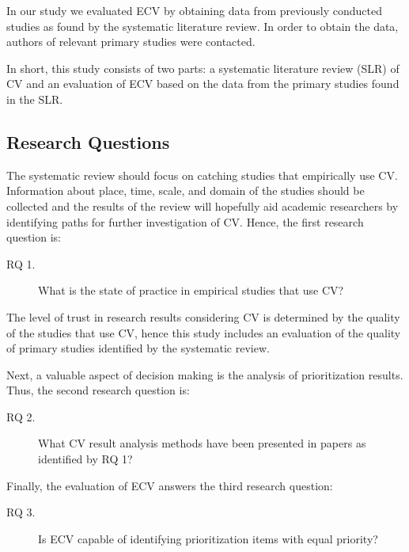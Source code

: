 In our study we evaluated ECV by obtaining data from previously conducted studies as found by the systematic literature review. In order to obtain the data, authors of relevant primary studies were contacted.

In short, this study consists of two parts: a systematic literature review (SLR) of CV and an evaluation of ECV based on the data from the primary studies found in the SLR.

\subsection{Research Questions}

The systematic review should focus on catching studies that empirically use CV. Information about place, time, scale, and domain of the studies should be collected and the results of the review will hopefully aid academic researchers by identifying paths for further investigation of CV. Hence, the first research question is:

\begin{description}
\item[RQ 1.] What is the state of practice in empirical studies that use CV?
\end{description}

The level of trust in research results considering CV is determined by the quality of the studies that use CV, hence this study includes an evaluation of the quality of primary studies identified by the systematic review.

Next, a valuable aspect of decision making is the analysis of prioritization results.
Thus, the second research question is:

\begin{description}
\item[RQ 2.] What CV result analysis methods have been presented in papers as identified by RQ 1?
\end{description}

Finally, the evaluation of ECV answers the third research question:

\begin{description}
\item[RQ 3.] Is ECV capable of identifying prioritization items with equal priority?
\end{description}